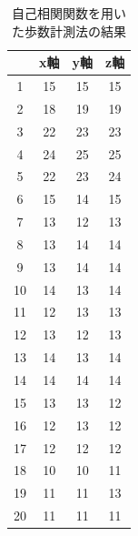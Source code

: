\begin{table}[htb]
  \begin{center}
    \caption{自己相関関数を用いた歩数計測法の結果}
    \label{data4}
    \begin{tabular}{|c|c|c|c|} \hline
      &x軸 & y軸 & z軸  \\ \hline \hline
      1 &	15 &	15 &	15  \\ \hline
      2 &	18 &	19 &	19  \\ \hline
      3 &	22 &	23 &	23  \\ \hline
      4 &	24 &	25 &	25  \\ \hline
      5 &	22 &	23 &	24  \\ \hline
      6 &	15 &	14 &	15  \\ \hline
      7 &	13 &	12 &	13  \\ \hline
      8 &	13 &	14 &	14  \\ \hline
      9 &	13 &	14 &	14  \\ \hline
      10 &	14 &	13 &	14  \\ \hline
      11 &	12 &	13 &	13  \\ \hline
      12 &	13 &	12 &	13  \\ \hline
      13 &	14 &	13 &	14  \\ \hline
      14 &	14 &	14 &	14  \\ \hline
      15 &	13 &	13 &	12  \\ \hline
      16 &	12 &	13 &	12  \\ \hline
      17 &	12 &	12 &	12  \\ \hline
      18 &	10 &	10 &	11  \\ \hline
      19 &	11 &	11 &	13  \\ \hline
      20 &	11 &	11 &	11  \\ \hline
    \end{tabular}
  \end{center}
\end{table}

